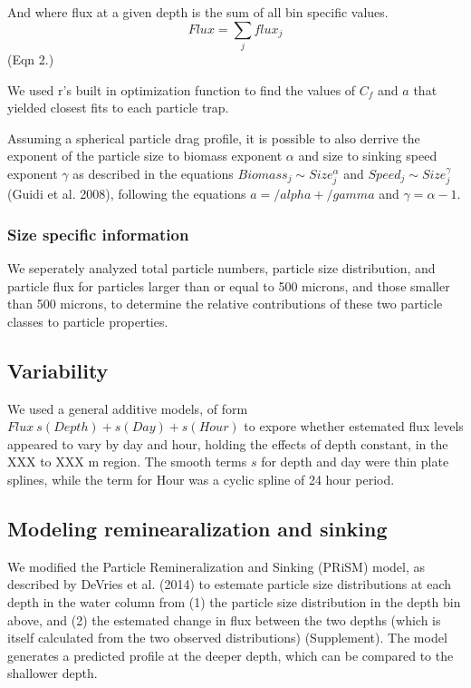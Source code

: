 \documentclass[]{article}
\begin{document}
And where flux at a given depth is the sum of all bin specific values.
\[Flux = \sum_j{flux_j} \] (Eqn 2.)

We used r's built in optimization function to find the values of \(C_f\)
and \(a\) that yielded closest fits to each particle trap.

Assuming a spherical particle drag profile, it is possible to also
derrive the exponent of the particle size to biomass exponent \(\alpha\)
and size to sinking speed exponent \(\gamma\) as described in the
equations \(Biomass_j \sim Size_j^\alpha\) and
\(Speed_j \sim Size_j^\gamma\) (Guidi et al. 2008), following the
equations \(a = /alpha + /gamma\) and \(\gamma = \alpha -1\).

\hypertarget{size-specific-information}{%
\subsubsection{Size specific
information}\label{size-specific-information}}

We seperately analyzed total particle numbers, particle size
distribution, and particle flux for particles larger than or equal to
500 microns, and those smaller than 500 microns, to determine the
relative contributions of these two particle classes to particle
properties.

\hypertarget{variability}{%
\subsection{Variability}\label{variability}}

We used a general additive models, of form
\(Flux ~ s(Depth) + s(Day) + s(Hour)\) to expore whether estemated flux
levels appeared to vary by day and hour, holding the effects of depth
constant, in the XXX to XXX m region. The smooth terms \(s\) for depth
and day were thin plate splines, while the term for Hour was a cyclic
spline of 24 hour period.

\hypertarget{modeling-reminearalization-and-sinking}{%
\subsection{Modeling reminearalization and
sinking}\label{modeling-reminearalization-and-sinking}}

We modified the Particle Remineralization and Sinking (PRiSM) model, as
described by DeVries et al. (2014) to estemate particle size
distributions at each depth in the water column from (1) the particle
size distribution in the depth bin above, and (2) the estemated change
in flux between the two depths (which is itself calculated from the two
observed distributions) (Supplement). The model generates a predicted
profile at the deeper depth, which can be compared to the shallower
depth.
\end{document}
